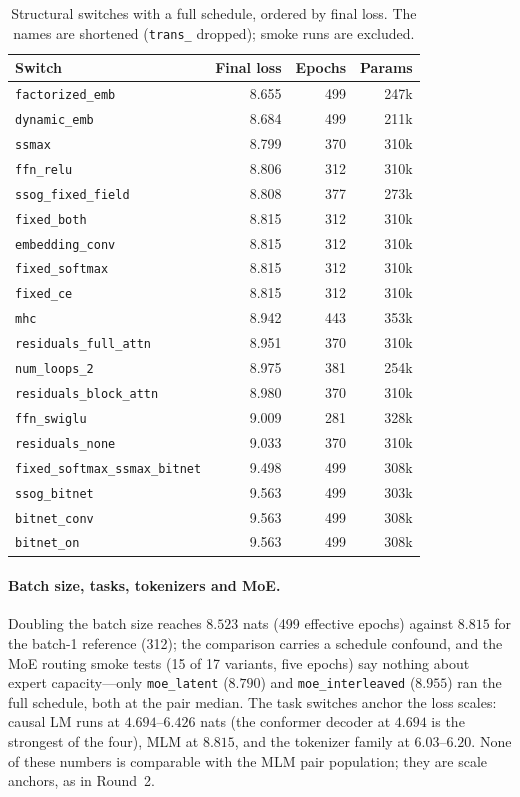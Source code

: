 \begin{table}[H]
\centering
\small
\caption{Structural switches with a full schedule, ordered by final loss. The names are shortened (\texttt{trans\_} dropped); smoke runs are excluded.}
\label{tab:r3-switches}
\begin{tabular}{lrrr}
\toprule
Switch & Final loss & Epochs & Params \\
\midrule
\texttt{factorized\_emb} & 8.655 & 499 & 247k \\
\texttt{dynamic\_emb} & 8.684 & 499 & 211k \\
\texttt{ssmax} & 8.799 & 370 & 310k \\
\texttt{ffn\_relu} & 8.806 & 312 & 310k \\
\texttt{ssog\_fixed\_field} & 8.808 & 377 & 273k \\
\texttt{fixed\_both} & 8.815 & 312 & 310k \\
\texttt{embedding\_conv} & 8.815 & 312 & 310k \\
\texttt{fixed\_softmax} & 8.815 & 312 & 310k \\
\texttt{fixed\_ce} & 8.815 & 312 & 310k \\
\texttt{mhc} & 8.942 & 443 & 353k \\
\texttt{residuals\_full\_attn} & 8.951 & 370 & 310k \\
\texttt{num\_loops\_2} & 8.975 & 381 & 254k \\
\texttt{residuals\_block\_attn} & 8.980 & 370 & 310k \\
\texttt{ffn\_swiglu} & 9.009 & 281 & 328k \\
\texttt{residuals\_none} & 9.033 & 370 & 310k \\
\texttt{fixed\_softmax\_ssmax\_bitnet} & 9.498 & 499 & 308k \\
\texttt{ssog\_bitnet} & 9.563 & 499 & 303k \\
\texttt{bitnet\_conv} & 9.563 & 499 & 308k \\
\texttt{bitnet\_on} & 9.563 & 499 & 308k \\
\bottomrule
\end{tabular}
\end{table}

\paragraph{Batch size, tasks, tokenizers and MoE.}
Doubling the batch size reaches $8.523$ nats (499 effective epochs) against $8.815$ for the batch-1 reference (312); the comparison carries a schedule confound, and the MoE routing smoke tests (15 of 17 variants, five epochs) say nothing about expert capacity---only \texttt{moe\_latent} ($8.790$) and \texttt{moe\_interleaved} ($8.955$) ran the full schedule, both at the pair median. The task switches anchor the loss scales: causal LM runs at $4.694$--$6.426$ nats (the conformer decoder at $4.694$ is the strongest of the four), MLM at $8.815$, and the tokenizer family at $6.03$--$6.20$. None of these numbers is comparable with the MLM pair population; they are scale anchors, as in Round~2.

